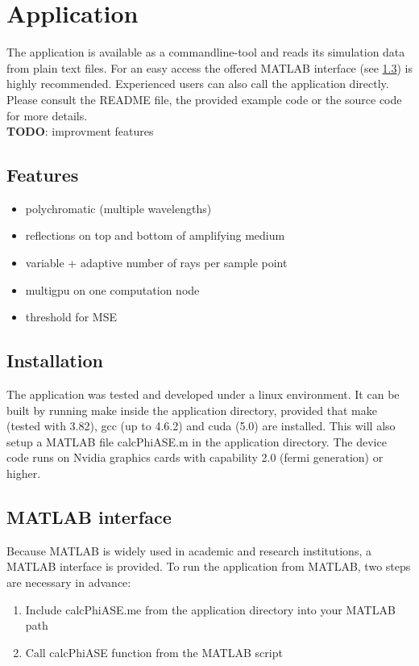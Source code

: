 \section{Application}

The application is available as a commandline-tool and reads
its simulation data from plain text files. 
For an easy access the offered MATLAB interface (see \ref{label:matlab_interface}) 
is highly recommended. Experienced users can also call the application
directly. Please consult the README file, the provided 
example code or the source code for more details.\\
\textbf{TODO}: improvment features
\subsection{Features}
\begin{itemize}
  \item polychromatic (multiple wavelengths)
  \item reflections on top and bottom of amplifying medium
  \item variable + adaptive number of rays per sample point
  \item multigpu on one computation node
  \item threshold for MSE
 \end{itemize}

\subsection{Installation}
The application was tested and developed under a linux environment.
It can be built by running make inside the application directory, provided
that make (tested with 3.82), gcc (up to 4.6.2) and cuda (5.0) are installed. 
This will also setup a MATLAB file calcPhiASE.m in the application
directory. The device code runs on Nvidia graphics cards with 
capability 2.0 (fermi generation) or higher. 

\subsection{MATLAB interface}
\label{label:matlab_interface}
Because MATLAB is widely used in academic and research institutions, a MATLAB
interface is provided. To run the application from MATLAB, two steps are
necessary in advance:
\begin{enumerate}
  \item Include calcPhiASE.me from the application directory into your MATLAB path
  \item Call calcPhiASE function from the MATLAB script
\end{enumerate}

